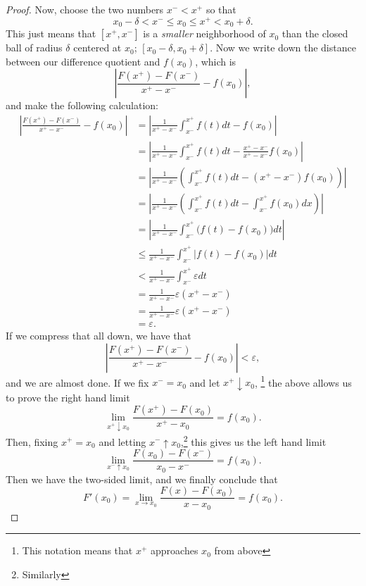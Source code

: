 \documentclass{article}
\begin{document}
\begin{proof}
    Now, choose the two numbers $x^- < x^+$ so that 
    \[
        x_0 - \delta < x^- \leq x_0 \leq x^+ < x_0 + \delta.
    \]
    This just means that $[x^+, x^-]$ is a \emph{smaller} neighborhood of $x_0$ than the closed ball of radius $\delta$ centered at $x_0$; $[x_0 - \delta, x_0 + \delta]$. 
    Now we write down the distance between our difference quotient and $f(x_0)$, which is
    \[
        \left|\frac{F(x^+)-F(x^-)}{x^+-x^-} - f(x_0)\right|,
    \]
    and make the following calculation:
    \begin{align*}
        \left|\frac{F(x^+)-F(x^-)}{x^+-x^-} - f(x_0)\right| &= \left|\frac{1}{x^+-x^-}\int_{x^-}^{x^+} f(t)dt - f(x_0)\right| \\
                                                            &= \left|\frac{1}{x^+-x^-}\int_{x^-}^{x^+} f(t)dt - \frac{x^+-x^-}{x^+-x^-}f(x_0)\right| \\
                                                            &= \left|\frac{1}{x^+-x^-}\left(\int_{x^-}^{x^+} f(t)dt - (x^+-x^-)f(x_0)\right)\right| \\
                                                            &= \left|\frac{1}{x^+-x^-}\left(\int_{x^-}^{x^+} f(t)dt - \int_{x^-}^{x^+}f(x_0)dx\right)\right| \\
                                                            &= \left|\frac{1}{x^+-x^-}\int_{x^-}^{x^+} \Big(f(t) - f(x_0)\Big)dt\right| \\
                                                            &\leq \frac{1}{x^+-x^-}\int_{x^-}^{x^+} \bigg|f(t) - f(x_0)\bigg|dt \\
                                                            &< \frac{1}{x^+-x^-}\int_{x^-}^{x^+} \varepsilon dt \\
                                                            &= \frac{1}{x^+-x^-}\varepsilon(x^+-x^-) \\
                                                            &= \frac{1}{x^+-x^-}\varepsilon(x^+-x^-) \\
                                                            &= \varepsilon.
    \end{align*}
    If we compress that all down, we have that
    \[
        \left|\frac{F(x^+)-F(x^-)}{x^+-x^-} - f(x_0)\right| < \varepsilon,
    \]
    and we are almost done. 
    If we fix $x^- = x_0$ and let $x^+\downarrow x_0$,
    \footnote{This notation means that $x^+$ approaches $x_0$ from above} 
    the above allows us to prove the right hand limit
    \[
        \lim_{x^+\downarrow x_0}\frac{F(x^+)-F(x_0)}{x^+-x_0} = f(x_0).
    \]
    Then, fixing $x^+ = x_0$ and letting $x^- \uparrow x_0$,\footnote{Similarly} this gives us the left hand limit
    \[
        \lim_{x^-\uparrow x_0}\frac{F(x_0)-F(x^-)}{x_0-x^-} = f(x_0).
    \]
    Then we have the two-sided limit, and we finally conclude that
    \[
        F'(x_0) = \lim_{x \to x_0}\frac{F(x)-F(x_0)}{x-x_0} = f(x_0).
    \]
\end{proof}
\end{document}
